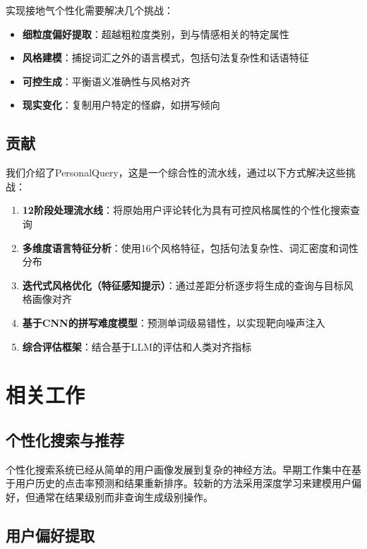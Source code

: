 \documentclass[11pt,a4paper]{article}
\begin{document}
实现接地气个性化需要解决几个挑战：
\begin{itemize}
    \item \textbf{细粒度偏好提取}：超越粗粒度类别，到与情感相关的特定属性
    \item \textbf{风格建模}：捕捉词汇之外的语言模式，包括句法复杂性和话语特征
    \item \textbf{可控生成}：平衡语义准确性与风格对齐
    \item \textbf{现实变化}：复制用户特定的怪癖，如拼写倾向
\end{itemize}

\subsection{贡献}

我们介绍了PersonalQuery，这是一个综合性的流水线，通过以下方式解决这些挑战：

\begin{enumerate}
    \item \textbf{12阶段处理流水线}：将原始用户评论转化为具有可控风格属性的个性化搜索查询

    \item \textbf{多维度语言特征分析}：使用16个风格特征，包括句法复杂性、词汇密度和词性分布

    \item \textbf{迭代式风格优化（特征感知提示）}：通过差距分析逐步将生成的查询与目标风格画像对齐

    \item \textbf{基于CNN的拼写难度模型}：预测单词级易错性，以实现靶向噪声注入

    \item \textbf{综合评估框架}：结合基于LLM的评估和人类对齐指标
\end{enumerate}

\section{相关工作}

\subsection{个性化搜索与推荐}

个性化搜索系统已经从简单的用户画像发展到复杂的神经方法。早期工作集中在基于用户历史的点击率预测和结果重新排序。较新的方法采用深度学习来建模用户偏好，但通常在结果级别而非查询生成级别操作。

\subsection{用户偏好提取}
\end{document}
